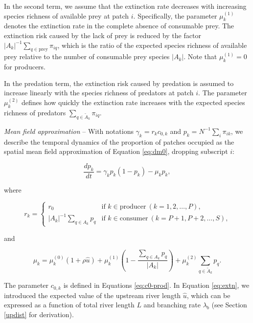 \documentclass[11pt, class=article, crop=false]{standalone}
\theoremstyle{definition}
\begin{document}
In the second term, we assume that the extinction rate decreases with increasing species richness of available prey at patch $i$.
Specifically, the parameter $\mu_{k}^{(1)}$ denotes the extinction rate in the complete absence of consumable prey.
The extinction risk caused by the lack of prey is reduced by the factor $|A_k|^{-1} \sum_{q \in \text{prey}} \pi_{iq}$, which is the ratio of the expected species richness of available prey relative to the number of consumable prey species $|A_k|$.
Note that $\mu_{k}^{(1)} = 0$ for producers.

In the predation term, the extinction risk caused by predation is assumed to increase linearly with the species richness of predators at patch $i$.
The parameter $\mu_{k}^{(2)}$ defines how quickly the extinction rate increases with the expected species richness of predators $\sum_{q \in \tilde{A}_k} \pi_{iq}$.

\textit{Mean field approximation} --
With notations $\gamma_k = r_{k} c_{0, k}$ and $p_k = N^{-1} \sum_i \pi_{ik}$, we describe the temporal dynamics of the proportion of patches occupied as the spatial mean field approximation of Equation \ref{eq:dm0}, dropping subscript $i$:

\begin{equation}
    \frac{dp_k}{dt} = \gamma_k p_{k} (1 - p_{k}) - \mu_{k} p_{k},
    \label{eq:master}
\end{equation}

where

\begin{equation}
    r_{k} = 
    \begin{cases}
        r_0 & \text{if $k \in \text{producer}~(k = 1, 2, \ldots, P)$,}\\
        |A_k|^{-1} \sum_{q \in A_k} p_{q} & \text{if $k \in \text{consumer}~(k = P + 1, P + 2, \ldots, S)$,}
    \end{cases}
\end{equation}

and

\begin{equation}
    \mu_{k} = 
        \mu_{k}^{(0)} (1 + \rho \hat{u}) + 
        \mu_{k}^{(1)} \left(1 - \frac{\sum_{q \in A_k} p_{q}}{|A_k|} \right) + 
        \mu_{k}^{(2)} \sum_{q \in \tilde{A}_k} p_{q}.
    \label{eq:extn}    
\end{equation}

The parameter $c_{0, k}$ is defined in Equations \ref{eq:c0-prod}. 
In Equation \ref{eq:extn}, we introduced the expected value of the upstream river length $\hat{u}$, which can be expressed as a function of total river length $L$ and branching rate $\lambda_b$ (see Section \ref{updist} for derivation).
\end{document}
